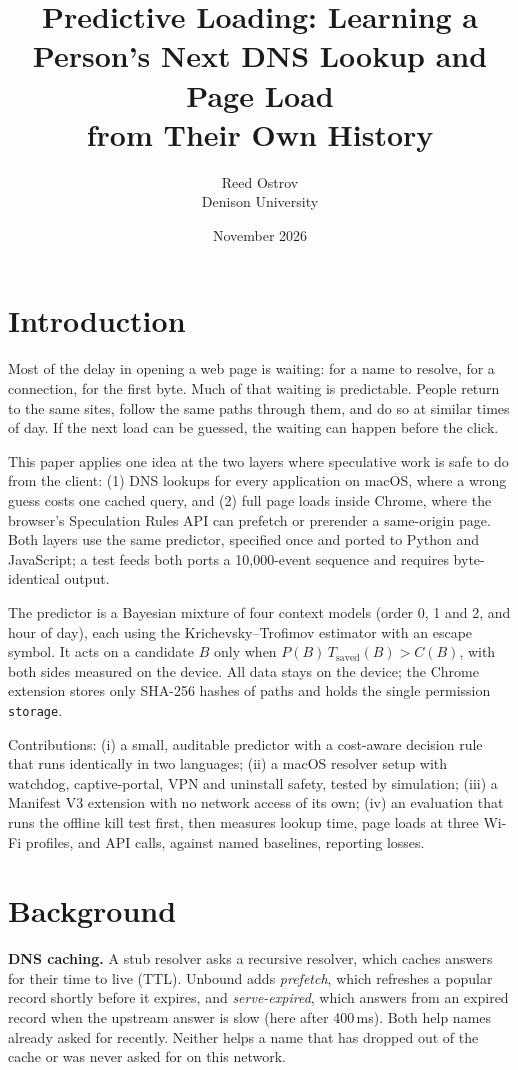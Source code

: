 \documentclass[11pt]{article}
\title{Predictive Loading: Learning a Person's Next DNS Lookup and Page Load\\from Their Own History}
\author{Reed Ostrov\\Denison University}
\date{November 2026}
\begin{document}
\maketitle

\begin{abstract}

\end{abstract}

\section{Introduction}
Most of the delay in opening a web page is waiting: for a name to resolve, for a connection, for the first byte. Much of that waiting is predictable. People return to the same sites, follow the same paths through them, and do so at similar times of day. If the next load can be guessed, the waiting can happen before the click.

This paper applies one idea at the two layers where speculative work is safe to do from the client: (1) DNS lookups for every application on macOS, where a wrong guess costs one cached query, and (2) full page loads inside Chrome, where the browser's Speculation Rules API \cite{specrules} can prefetch or prerender a same-origin page. Both layers use the same predictor, specified once and ported to Python and JavaScript; a test feeds both ports a 10{,}000-event sequence and requires byte-identical output.

The predictor is a Bayesian mixture of four context models (order 0, 1 and 2, and hour of day), each using the Krichevsky--Trofimov estimator \cite{kt1981} with an escape symbol. It acts on a candidate $B$ only when $P(B)\,T_{\mathrm{saved}}(B) > C(B)$, with both sides measured on the device. All data stays on the device; the Chrome extension stores only SHA-256 hashes of paths and holds the single permission \texttt{storage}.

Contributions: (i) a small, auditable predictor with a cost-aware decision rule that runs identically in two languages; (ii) a macOS resolver setup with watchdog, captive-portal, VPN and uninstall safety, tested by simulation; (iii) a Manifest V3 extension with no network access of its own; (iv) an evaluation that runs the offline kill test first, then measures lookup time, page loads at three Wi-Fi profiles, and API calls, against named baselines, reporting losses.

\section{Background}
\textbf{DNS caching.} A stub resolver asks a recursive resolver, which caches answers for their time to live (TTL). Unbound \cite{unbound} adds \emph{prefetch}, which refreshes a popular record shortly before it expires, and \emph{serve-expired}, which answers from an expired record when the upstream answer is slow (here after 400\,ms). Both help names already asked for recently. Neither helps a name that has dropped out of the cache or was never asked for on this network.
\end{document}
